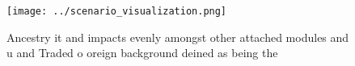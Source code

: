 \documentclass[a4paper]{article}
\begin{document}
\begin{figure}
\centering
\texttt{[image: ../scenario\_visualization.png]}
\caption{Ancestry it and impacts evenly amongst other attached modules and u and Traded o oreign background deined as being the 
}
\end{figure}
 
\end{document}
